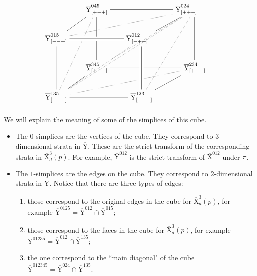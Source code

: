 \documentclass[10pt]{amsart}
\numberwithin{equation}{section}
\theoremstyle{plain}
\numberwithin{equation}{section}
\theoremstyle{definition}
\theoremstyle{remark}
\def\rmX{\mathrm{X}}
\def\rmXbar{\overline{\rmX}}
\def\rmY{\mathrm{Y}}
\def\rmYbar{\overline{\rmY}}
\begin{document}
\begin{equation}\label{primitive-cube}
\begin{tikzpicture}
  \matrix (m) [matrix of math nodes, row sep=2em,
    column sep=2em]{
     &  {\rmYbar}^{045}_{[+-+]} \vphantom{f^{*}}  & &   {\rmYbar}^{024}_{[+++]}\hphantom{EEE}\\
      {\rmYbar}^{015}_{[--+]} \vphantom{f^{*}}& &         {\rmYbar}^{012}_{[-++]} \hphantom{Ee}& \\
    & {\rmYbar}^{345}_{[+--]} \vphantom{U}  & &       {\rmYbar}^{234}_{[++-]} \vphantom{E}\\
       {\rmYbar}^{135}_{[---]}  \vphantom{M} & &    {\rmYbar}^{123}_{[-+-]} \vphantom{N} & \\}  ;
     \path
    (m-1-2) edge (m-1-4) edge (m-2-1) edge (m-3-2) edge[densely dotted](m-4-1) 
    (m-1-4) edge (m-3-4) edge (m-2-3) edge[densely dotted] (m-3-2) edge[densely dotted](m-4-1)  edge[densely dotted] (m-2-1) edge[densely dotted] (m-4-3)
    (m-2-1) edge [-,line width=6pt,draw=white] (m-2-3) edge (m-2-3) edge (m-4-1) 
    (m-3-2) edge  (m-3-4) edge (m-4-1) 
    (m-4-1) edge (m-4-3) 
    (m-3-4) edge (m-4-3) edge[densely dotted](m-4-1)
    (m-2-3) edge [-,line width=6pt,draw=white] (m-4-3) edge (m-4-3) edge[densely dotted](m-4-1) ;
\end{tikzpicture}
\end{equation}
We will explain the meaning of some of the simplices of this cube. 
\begin{itemize}
\item The $0$-simplices are the vertices of the cube. They correspond to $3$-dimensional strata in ${\rmYbar}$. These are the strict transform of the corresponding strata in $\rmXbar^{3}_{d}(p)$. For example, $\rmYbar^{012}$ is the strict transform of $\rmXbar^{012}$ under $\pi$. 

\item The $1$-simplices are the edges on the cube. They correspond to $2$-dimensional strata in ${\rmYbar}$. Notice that there are three types of edges: 
\begin{enumerate}
\item those correspond to the original edges in the cube for $\rmXbar^{3}_{d}(p)$, for example $\rmYbar^{0125}=\rmYbar^{012}\cap \rmYbar^{015}$; 
\item those correspond to the faces in the  cube for $\rmXbar^{3}_{d}(p)$, for example $\rmY^{01235}=\rmYbar^{012}\cap \rmYbar^{135}$; 
\item the one correspond to the ``main diagonal" of the cube $\rmYbar^{012345}=\rmYbar^{024}\cap \rmYbar^{135}$.
\end{enumerate}
\end{itemize}
\end{document}
